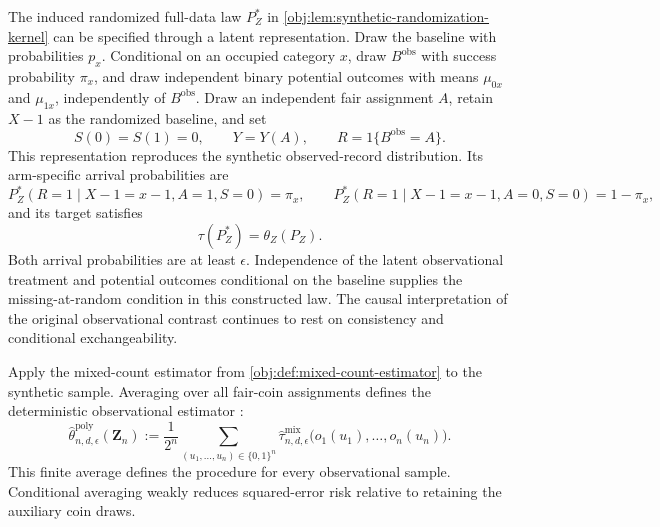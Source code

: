 The induced randomized full-data law \(P_Z^*\) in \cref{obj:lem:synthetic-randomization-kernel} can be specified through a latent representation. Draw the baseline with probabilities \(p_x\). Conditional on an occupied category \(x\), draw \(B^{\mathrm{obs}}\) with success probability \(\pi_x\), and draw independent binary potential outcomes with means \(\mu_{0x}\) and \(\mu_{1x}\), independently of \(B^{\mathrm{obs}}\). Draw an independent fair assignment \(A\), retain \(X-1\) as the randomized baseline, and set
\[
S(0)=S(1)=0,\qquad
Y=Y(A),\qquad
R=1\{B^{\mathrm{obs}}=A\}.
\]
This representation reproduces the synthetic observed-record distribution. Its arm-specific arrival probabilities are
\[
P_Z^*(R=1\mid X-1=x-1,A=1,S=0)=\pi_x,
\qquad
P_Z^*(R=1\mid X-1=x-1,A=0,S=0)=1-\pi_x,
\]
and its target satisfies
\[
\tau(P_Z^*)=\theta_Z(P_Z).
\]
Both arrival probabilities are at least \(\epsilon\). Independence of the latent observational treatment and potential outcomes conditional on the baseline supplies the missing-at-random condition in this constructed law. The causal interpretation of the original observational contrast continues to rest on consistency and conditional exchangeability.

Apply the mixed-count estimator
from \cref{obj:def:mixed-count-estimator} to the synthetic sample. Averaging over all fair-coin assignments defines the deterministic observational estimator
:
\[
\widehat\theta^{\mathrm{poly}}_{n,d,\epsilon}(\mathbf Z_n)
:=
\frac{1}{2^n}
\sum_{(u_1,\ldots,u_n)\in\{0,1\}^n}
\widehat\tau^{\mathrm{mix}}_{n,d,\epsilon}
\bigl(o_1(u_1),\ldots,o_n(u_n)\bigr).
\]
This finite average defines the procedure for every observational sample. Conditional averaging weakly reduces squared-error risk relative to retaining the auxiliary coin draws.

